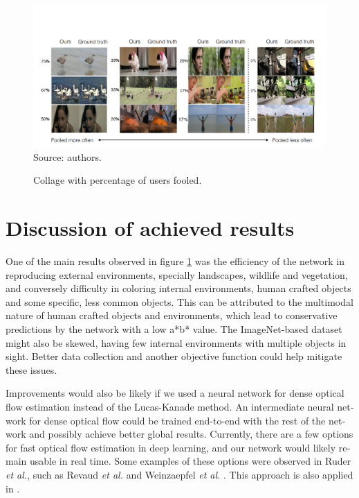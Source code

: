 \documentclass[12pt,openright,oneside,a4paper,english, brazilian]{abntex2}
\begin{document}
\begin{otherlanguage}{english}
\begin{figure}[H]
\centering
\caption{Collage with percentage of users fooled.}
\includegraphics[width=\textwidth+20pt]{fool_collage}
Source: authors.
\label{fig:fool_collage}
\end{figure}

\chapter{Discussion of achieved results}
One of the main results observed in figure \ref{fig:fool_collage} was the efficiency of the network in reproducing external environments, specially landscapes, wildlife and vegetation, and conversely difficulty in coloring internal environments, human crafted objects and some specific, less common objects. This can be attributed to the multimodal nature of human crafted objects and environments, which lead to conservative predictions by the network with a low a*b* value.  The ImageNet-based dataset might also be skewed, having few internal environments with multiple objects in sight. Better data collection and another objective function could help mitigate these issues.

Improvements would also be likely if we used a neural network for dense optical flow estimation instead of the Lucas-Kanade method. An intermediate neural network for dense optical flow could be trained end-to-end with the rest of the network and possibly achieve better global results. Currently, there are a few options for fast optical flow estimation in deep learning, and our network would likely remain usable in real time. Some examples of these options were observed in Ruder \textit{et al.}\cite{Ruder2016}, such as Revaud \textit{et al.} \cite{epicflow} and Weinzaepfel \textit{et al.} \cite{deepflow}. This approach is also applied in \cite{MSFT_transfer}.



\end{otherlanguage}
\end{document}
